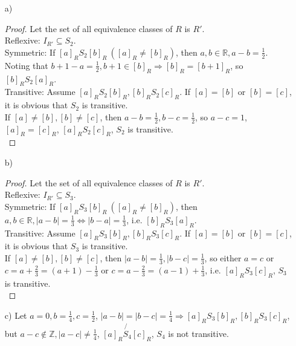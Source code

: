 \documentclass{article}
\begin{document}
\begin{itemize}
    \item [a)]
    \begin{proof}
        Let the set of all equivalence classes of $R$ is $R'$. \\
        Reflexive: $I_{R'} \subseteq S_2$. \\
        Symmetric: If $[a]_RS_2[b]_R \ ([a]_R \neq [b]_R)$, then $a, b \in \mathbb{R}, a - b = \frac{1}{2}$. Noting that $b + 1 - a = \frac{1}{2}, b + 1 \in [b]_R \Rightarrow [b]_R = [b + 1]_R$, so $[b]_RS_2[a]_R$. \\
        Transitive: Assume $[a]_RS_2[b]_R, [b]_RS_2[c]_R$. If $[a] = [b]$ or $[b] = [c]$, it is obvious that $S_2$ is transitive. \\
        If $[a] \neq [b], [b] \neq [c]$, then $a - b = \frac{1}{2}, b - c = \frac{1}{2}$, so $a - c = 1$, $[a]_R = [c]_R$, $[a]_RS_2[c]_R$, $S_2$ is transitive. \\
    \end{proof}
    \item [b)] 
    \begin{proof}
        Let the set of all equivalence classes of $R$ is $R'$. \\
        Reflexive: $I_{R'} \subseteq S_3$. \\
        Symmetric: If $[a]_RS_3[b]_R \ ([a]_R \neq [b]_R)$, then $a, b \in \mathbb{R}, \left\lvert a - b \right\rvert  = \frac{1}{3} \Leftrightarrow \left\lvert b - a \right\rvert  = \frac{1}{3}$, i.e. $[b]_RS_3[a]_R$. \\
        Transitive: Assume $[a]_RS_3[b]_R, [b]_RS_3[c]_R$. If $[a] = [b]$ or $[b] = [c]$, it is obvious that $S_3$ is transitive. \\
        If $[a] \neq [b], [b] \neq [c]$, then $\left\lvert a - b \right\rvert  = \frac{1}{3}, \left\lvert b - c \right\rvert  = \frac{1}{3}$, so either $a = c$ or $c = a + \frac{2}{3} = (a + 1) - \frac{1}{3}$ or $c = a - \frac{2}{3} = (a - 1) + \frac{1}{3}$, i.e. $[a]_RS_3[c]_R$, $S_3$ is transitive. \\
    \end{proof}
    \item [c)] Let $a = 0, b = \frac{1}{4}, c = \frac{1}{2}$, $\left\lvert a - b \right\rvert = \left\lvert b - c \right\rvert = \frac{1}{4} \Rightarrow [a]_RS_3[b]_R, [b]_RS_3[c]_R$, but $a - c \notin \mathbb{Z}, \left\lvert a - c\right\rvert \neq \frac{1}{4}$, $[a]_R\not{S_4}[c]_R$, $S_4$ is not transitive.
\end{itemize}
\end{document}

